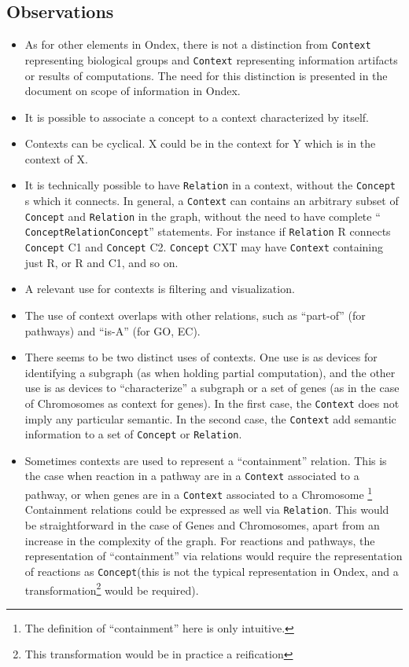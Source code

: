 \documentclass[a4paper,10pt]{article}
\newcommand{\term}[1]{\texttt{#1}\xspace}
\newcommand{\co}{\term{Concept}}
\newcommand{\cxt}{\term{Context}}
\newcommand{\re}{\term{Relation}}
\begin{document}
\subsection{Observations}
\begin{itemize}
\item As for other elements in Ondex, there is not a distinction from \cxt representing biological groups  and \cxt representing information artifacts or results of computations. The need for this distinction is presented in the document on scope of information in Ondex.

\item It is possible to associate a concept to a context characterized by itself.

\item Contexts can be cyclical. X could be in the context for Y which is in the context of X.

\item It is technically possible to have \re in a context, without  the \co s which it connects. In general, a \cxt can contains an arbitrary subset of \co and \re in the graph, without the need to have complete `` \co \re \co'' statements. For instance if \re R connects \co C1 and \co C2. \co CXT may have \cxt containing just R, or R and C1, and so on.

\item A relevant use for contexts is filtering and visualization.

\item The use of context overlaps with other relations, such as ``part-of'' (for pathways) and ``is-A'' (for GO, EC). 

\item There seems to be two distinct uses of contexts. One use is as devices for identifying a subgraph (as when holding partial computation), and the other use is as devices to ``characterize'' a subgraph or a set of genes (as in the case of Chromosomes as context for genes). In the first case, the \cxt does not imply any particular semantic. In the second case, the \cxt add semantic information to a set of \co or \re.

\item Sometimes contexts are used to represent a ``containment'' relation. This is the case when reaction in a pathway are in a \cxt associated to a pathway, or when genes are in a  \cxt associated to a Chromosome \footnote{The definition of ``containment'' here is only intuitive.} Containment relations could be expressed as well via \re. This would be straightforward in the case of Genes and Chromosomes, apart from an increase in the complexity of the graph. For reactions and pathways, the representation of ``containment'' via relations would require the representation of reactions as \co (this is not the typical representation in Ondex, and a transformation\footnote{This transformation would be in practice a reification} would be required).


\end{itemize}
\end{document}
